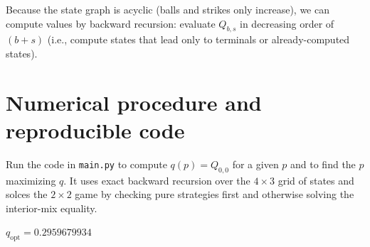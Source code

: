 \documentclass[10pt]{article}
\begin{document}
Because the state graph is acyclic (balls and strikes only increase), we can compute values by backward recursion: evaluate $Q_{b, s}$ in decreasing order of $(b + s) $ (i.e., compute states that lead only to terminals or already-computed states).

\section{Numerical procedure and reproducible code}

Run the code in \verb|main.py| to compute $q(p) = Q_{0, 0}$ for a given $p $ and to find the $p $ maximizing $q $. It uses exact backward recursion over the $4 \times 3 $ grid of states and solces the $2 \times 2 $ game by checking pure strategies first and otherwise solving the interior-mix equality.

$q_{\text{opt}} = 0.2959679934 $
\end{document}

